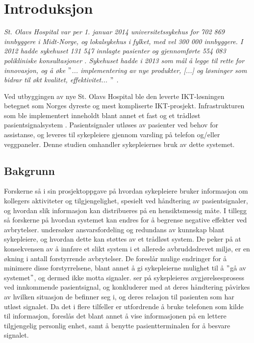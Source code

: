 \chapter{Introduksjon}
\label{chp:introduksjon}

\textit{St. Olavs Hospital var per 1. januar 2014 universitetssykehus for 702 869 innbyggere i Midt-Norge, og lokalsykehus i fylket, med vel 300 000 innbyggere. I 2012 hadde sykehuset 131 547 innlagte pasienter og gjennomførte 554 083 polikliniske konsultasjoner \citep{stolavs}. Sykehuset hadde i 2013 som mål å legge til rette for innovasjon, og å øke $"$... implementering av nye produkter, [...] og løsninger som bidrar til økt kvalitet, effektivitet... $"$ \citep{styring13}.}

\noindent
Ved utbyggingen av nye St. Olavs Hospital ble den leverte IKT-løsningen betegnet som Norges dyreste og mest kompliserte IKT-prosjekt. Infrastrukturen som ble implementert inneholdt blant annet et fast og et trådløst pasientsignalsystem \citep{TU}. Pasientsignaler utløses av pasienter ved behov for assistanse, og leveres til sykepleiere gjennom varsling på telefon og/eller veggpaneler. Denne studien omhandler sykepleiernes bruk av dette systemet.  

\section{Bakgrunn}
Forskerne så i sin prosjektoppgave \citep{Sund13} på hvordan sykepleiere bruker informasjon om kollegers aktiviteter og tilgjengelighet, spesielt ved håndtering av pasientsignaler, og hvordan slik informasjon kan distribueres på en hensiktsmessig måte. I tillegg så forskerne på hvordan systemet kan endres for å begrense negative effekter ved avbrytelser. \citet{KlemetsRedundancy} undersøker ansvarsfordeling og redundans av kunnskap blant sykepleiere, og hvordan dette kan støttes av et trådløst system. De peker på at konsekvensen av å innføre et slikt system i et allerede avbruddsdrevet miljø, er en økning i antall forstyrrende avbrytelser. De foreslår mulige endringer for å minimere disse forstyrrelsene, blant annet å gi sykepleierne mulighet til å $"$gå av systemet$"$, og dermed ikke motta signaler. \citet{klemets13} ser på sykepleieres avgjørelsesprosess ved innkommende pasientsignal, og konkluderer med at deres håndtering påvirkes av hvilken situasjon de befinner seg i, og deres relasjon til pasienten som har utløst signalet. Da det i flere tilfeller er utfordrende å bruke telefonen som kilde til informasjon, foreslås det blant annet å vise informasjonen på en lettere tilgjengelig personlig enhet, samt å benytte pasientterminalen for å besvare signalet.

